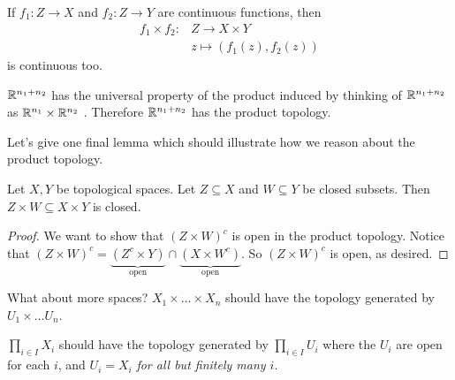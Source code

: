 \documentclass[12pt, twosided]{article}
\begin{document}
\begin{cor}
  If \(f_1: Z \to X\) and \(f_2: Z \to Y\) are continuous functions, then
  \begin{align*}
    f_1 \times f_2: &Z \to X \times Y \\
                    &z \mapsto (f_1(z), f_2(z))
  \end{align*}
  is continuous too.
\end{cor}

\begin{exa}
  \(\mathbb{R}^{n_1 + n_2}\) has the universal property of the product induced by thinking of \(\mathbb{R}^{n_1 + n_2}\) as \(\mathbb{R}^{n_1} \times \mathbb{R}^{n_2}\) . Therefore \(\mathbb{R}^{n_1 + n_2}\) has the product topology.
\end{exa}
Let's give one final lemma which should illustrate how we reason about the product topology.

\begin{lm}
  Let \(X, Y\) be topological spaces. Let \(Z \subseteq X\) and \(W \subseteq Y\) be closed subsets. Then \(Z \times W \subseteq X \times Y\) is closed.
\end{lm}

\begin{proof}
  We want to show that \((Z \times W)^c\) is open in the product topology. Notice that \((Z \times W)^c = \underbrace{(Z^c \times Y)}_{\mathrm{open}} \cap \underbrace{(X \times W^c)}_{\mathrm{open}}\). So \((Z \times W)^c\) is open, as desired.
\end{proof}

\begin{ques}
  What about more spaces? \(X_1 \times \ldots \times X_n\) should have the topology generated by \(U_1 \times \ldots U_n\).

  \(\prod_{i \in I} X_i\) should have the topology generated by \(\prod_{i \in I} U_i\) where the \(U_i\) are open for each \(i\), and \(U_i = X_i\) \textit{for all but finitely many \(i\)}.
\end{ques}
\end{document}

